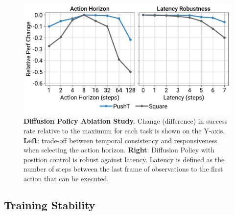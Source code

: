 \documentclass[Afour,sageh,times]{sagej}
\begin{document}
\begin{figure}[h]
\centering
\includegraphics[width=\linewidth]{figure/ablation_figure.pdf}
\vspace{-6mm}

\caption{\textbf{Diffusion Policy Ablation Study.} 
Change (difference) in success rate relative to the maximum for each task is shown on the Y-axis.
\textbf{Left}: trade-off between temporal consistency and responsiveness when selecting the action horizon. 
\textbf{Right}: Diffusion Policy with position control is robust against latency.
Latency is defined as the number of steps between the last frame of observations to the first action that can be executed.
} 
\label{fig:ablation}
\vspace{-5mm}
\end{figure}




\subsection{Training Stability}
\label{sec:ibc_stability}
\end{document}

